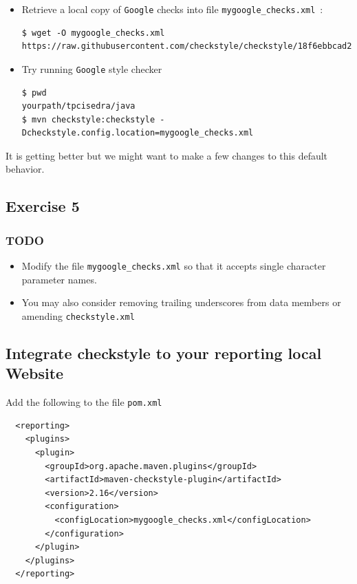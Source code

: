 \documentclass{article}
\begin{document}
\begin{itemize}
\item Retrieve a local copy of \texttt{Google} checks into file \texttt{mygoogle\_checks.xml}~:
\begin{lstlisting}[breaklines=true]
$ wget -O mygoogle_checks.xml https://raw.githubusercontent.com/checkstyle/checkstyle/18f6ebbcad23e88e3ae30fc79be464b8b7772a0d/google_checks.xml
\end{lstlisting}
\item Try running \texttt{Google} style checker
\begin{lstlisting}
$ pwd
yourpath/tpcisedra/java
$ mvn checkstyle:checkstyle -Dcheckstyle.config.location=mygoogle_checks.xml
\end{lstlisting}
\end{itemize}

It is getting better but we might want to make a few changes to this default behavior.

\subsection{Exercise 5}

\subsubsection{TODO}

\begin{itemize}
\item  Modify the file \texttt{mygoogle\_checks.xml} so that it accepts single character parameter names.
\item You may also consider removing trailing underscores from data members or amending \texttt{checkstyle.xml}
\end{itemize}

\subsection{Integrate checkstyle to your reporting local Website}

Add the following to the file \texttt{pom.xml}
\begin{lstlisting}
  <reporting>
    <plugins>
      <plugin>
        <groupId>org.apache.maven.plugins</groupId>
        <artifactId>maven-checkstyle-plugin</artifactId>
        <version>2.16</version>
        <configuration>
          <configLocation>mygoogle_checks.xml</configLocation>
        </configuration>
      </plugin>
    </plugins>
  </reporting>
\end{lstlisting}
\end{document}
